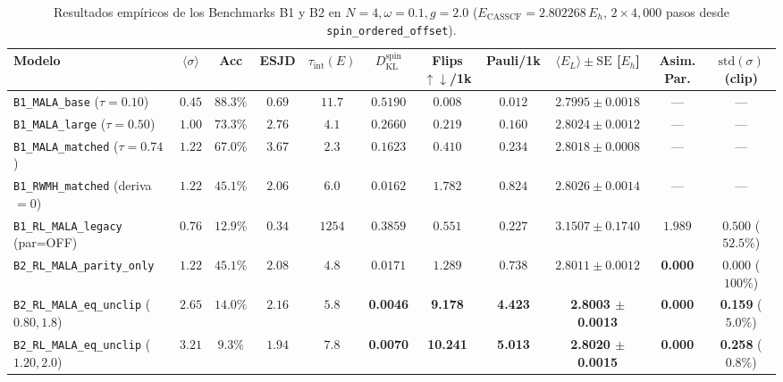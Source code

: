 \documentclass[10pt,a4paper]{article}
\begin{document}
\begin{table}[H]
\centering
\caption{Resultados empíricos de los Benchmarks B1 y B2 en $N=4, \omega=0.1, g=2.0$ ($E_{\mathrm{CASSCF}} = 2.802268\,E_h$, $2\times 4{,}000$ pasos desde \texttt{spin\_ordered\_offset}).}
\label{tab:ablation_b1_b2_local}
\begin{adjustbox}{max width=\textwidth}
\begin{tabular}{lcccccccccc}
\toprule
\textbf{Modelo} & $\langle\sigma\rangle$ & \textbf{Acc} & \textbf{ESJD} & $\tau_{\mathrm{int}}(E)$ & $D_{\mathrm{KL}}^{\mathrm{spin}}$ & \textbf{Flips $\uparrow\downarrow$/1k} & \textbf{Pauli/1k} & $\langle E_L\rangle \pm \mathrm{SE}$ [$E_h$] & \textbf{Asim. Par.} & $\mathrm{std}(\sigma)$ (\textbf{clip}) \\
\midrule
\texttt{B1\_MALA\_base} ($\tau=0.10$) & $0.45$ & $88.3\%$ & $0.69$ & $11.7$ & $0.5190$ & $0.008$ & $0.012$ & $2.7995 \pm 0.0018$ & --- & --- \\
\texttt{B1\_MALA\_large} ($\tau=0.50$) & $1.00$ & $73.3\%$ & $2.76$ & $4.1$ & $0.2660$ & $0.219$ & $0.160$ & $2.8024 \pm 0.0012$ & --- & --- \\
\texttt{B1\_MALA\_matched} ($\tau=0.74$) & $1.22$ & $67.0\%$ & $3.67$ & $2.3$ & $0.1623$ & $0.410$ & $0.234$ & $2.8018 \pm 0.0008$ & --- & --- \\
\texttt{B1\_RWMH\_matched} (deriva$=0$) & $1.22$ & $45.1\%$ & $2.06$ & $6.0$ & $0.0162$ & $1.782$ & $0.824$ & $2.8026 \pm 0.0014$ & --- & --- \\
\texttt{B1\_RL\_MALA\_legacy} (par=OFF) & $0.76$ & $12.9\%$ & $0.34$ & $1254$ & $0.3859$ & $0.551$ & $0.227$ & $3.1507 \pm 0.1740$ & $1.989$ & $0.500$ ($52.5\%$) \\
\texttt{B2\_RL\_MALA\_parity\_only} & $1.22$ & $45.1\%$ & $2.08$ & $4.8$ & $0.0171$ & $1.289$ & $0.738$ & $2.8011 \pm 0.0012$ & \textbf{0.000} & $0.000$ ($100\%$) \\
\texttt{B2\_RL\_MALA\_eq\_unclip} ($0.80, 1.8$) & $2.65$ & $14.0\%$ & $2.16$ & $5.8$ & \textbf{0.0046} & \textbf{9.178} & \textbf{4.423} & \textbf{2.8003 $\pm$ 0.0013} & \textbf{0.000} & \textbf{0.159} ($5.0\%$) \\
\texttt{B2\_RL\_MALA\_eq\_unclip} ($1.20, 2.0$) & $3.21$ & $9.3\%$ & $1.94$ & $7.8$ & \textbf{0.0070} & \textbf{10.241} & \textbf{5.013} & \textbf{2.8020 $\pm$ 0.0015} & \textbf{0.000} & \textbf{0.258} ($0.8\%$) \\
\bottomrule
\end{tabular}
\end{adjustbox}
\end{table}
\end{document}
